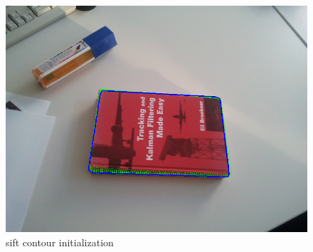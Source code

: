 \begin{figure}[htbp]
  \centering
\includegraphics[width=\linewidth]{images/sift_result.png}
\caption{sift contour initialization}
\label{fig:sift_result}
\end{figure}


